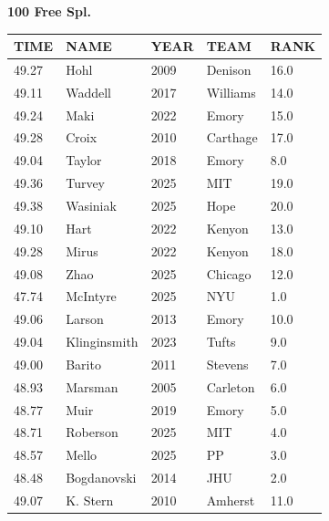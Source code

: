 \begin{table}[H]
\centering
\begin{minipage}[t]{0.6\textwidth}
\centering
\textbf{100 Free Spl.}\\[0.1cm]
\begin{tabular}{@{}p{1.8cm}p{2.8cm}p{1.2cm}p{1.4cm}p{0.8cm}@{}}
\hline
    \textbf{TIME} & \textbf{NAME} & \textbf{YEAR} & \textbf{TEAM} & \textbf{RANK} \\
\hline
    49.27 & Hohl & 2009 & Denison & 16.0 \\
    49.11 & Waddell & 2017 & Williams & 14.0 \\
    49.24 & Maki & 2022 & Emory & 15.0 \\
    49.28 & Croix & 2010 & Carthage & 17.0 \\
    49.04 & Taylor & 2018 & Emory & 8.0 \\
    49.36 & Turvey & 2025 & MIT & 19.0 \\
    49.38 & Wasiniak & 2025 & Hope & 20.0 \\
    49.10 & Hart & 2022 & Kenyon & 13.0 \\
    49.28 & Mirus & 2022 & Kenyon & 18.0 \\
    49.08 & Zhao & 2025 & Chicago & 12.0 \\
    47.74 & McIntyre & 2025 & NYU & 1.0 \\
    49.06 & Larson & 2013 & Emory & 10.0 \\
    49.04 & Klinginsmith & 2023 & Tufts & 9.0 \\
    49.00 & Barito & 2011 & Stevens & 7.0 \\
    48.93 & Marsman & 2005 & Carleton & 6.0 \\
    48.77 & Muir & 2019 & Emory & 5.0 \\
    48.71 & Roberson & 2025 & MIT & 4.0 \\
    48.57 & Mello & 2025 & PP & 3.0 \\
    48.48 & Bogdanovski & 2014 & JHU & 2.0 \\
    49.07 & K. Stern & 2010 & Amherst & 11.0 \\
\hline
\end{tabular}
\end{minipage}
\end{table}

